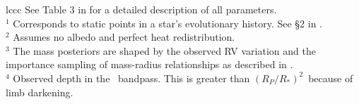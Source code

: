 \begin{deluxetable*}{lccc}
\scriptsize See Table 3 in \citet{eastman:2019} for a detailed description of all parameters.\\
$^1$ Corresponds to static points in a star's evolutionary history. See \S2 in \citet{dotter:2016}.\\
$^2$ Assumes no albedo and perfect heat redistribution.\\
$^3$ The mass posteriors are shaped by the observed RV variation and the importance sampling of mass-radius relationships as described in .\\
$^4$ Observed depth in the \kep\ bandpass. This is greater than $(R_P/R_*)^2$\ because of limb darkening.

\end{deluxetable*}
